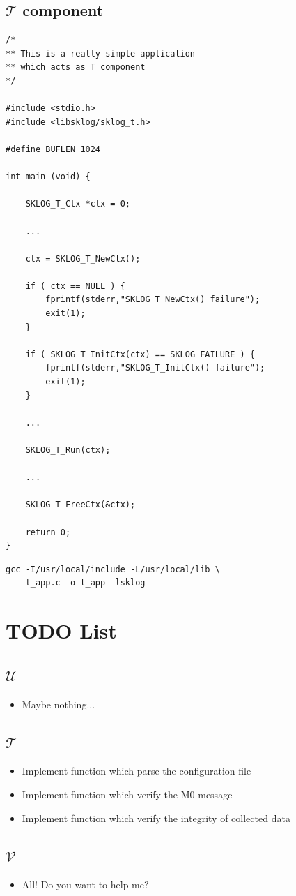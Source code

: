 \documentclass[a4paper,12pt]{article}
\def\u{$\mathcal{U}$\xspace}
\def\t{$\mathcal{T}$\xspace}
\def\v{$\mathcal{V}$\xspace}
\begin{document}
\subsection{\t component}
\begin{lstlisting}
/*
** This is a really simple application
** which acts as T component
*/

#include <stdio.h>
#include <libsklog/sklog_t.h>

#define BUFLEN 1024

int main (void) {

    SKLOG_T_Ctx *ctx = 0;

    ...

    ctx = SKLOG_T_NewCtx();

    if ( ctx == NULL ) {
        fprintf(stderr,"SKLOG_T_NewCtx() failure");
        exit(1);
    }

    if ( SKLOG_T_InitCtx(ctx) == SKLOG_FAILURE ) {
        fprintf(stderr,"SKLOG_T_InitCtx() failure");
        exit(1);
    }

    ...
    
    SKLOG_T_Run(ctx);

    ...

    SKLOG_T_FreeCtx(&ctx);

    return 0;
} 
\end{lstlisting}

\begin{lstlisting}
gcc -I/usr/local/include -L/usr/local/lib \
    t_app.c -o t_app -lsklog
\end{lstlisting}
\newpage
\section{TODO List}

\subsection{\u}

\begin{itemize}
\item Maybe nothing...
\end{itemize}

\subsection{\t}

\begin{itemize}
\item Implement function which parse the configuration file
\item Implement function which verify the M0 message
\item Implement function which verify the integrity of collected data
\end{itemize}

\subsection{\v}

\begin{itemize}
\item All! Do you want to help me?
\end{itemize}
\end{document}
